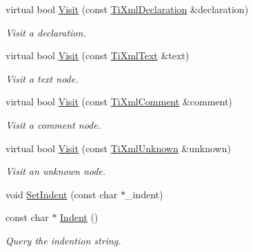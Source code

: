 \begin{DoxyCompactItemize}
virtual bool \hyperlink{classTiXmlPrinter_adaf7eec4dc43ad071ff52b60361574f5}{Visit} (const \hyperlink{classTiXmlDeclaration}{Ti\+Xml\+Declaration} \&declaration)
\begin{DoxyCompactList}\small\item\em Visit a declaration. \end{DoxyCompactList}\item 
\mbox{\label{classTiXmlPrinter_a0857c5d32c59b9a257f9a49cb9411df5}} 
virtual bool \hyperlink{classTiXmlPrinter_a0857c5d32c59b9a257f9a49cb9411df5}{Visit} (const \hyperlink{classTiXmlText}{Ti\+Xml\+Text} \&text)
\begin{DoxyCompactList}\small\item\em Visit a text node. \end{DoxyCompactList}\item 
\mbox{\label{classTiXmlPrinter_a9870423f5603630e6142f6bdb66dfb57}} 
virtual bool \hyperlink{classTiXmlPrinter_a9870423f5603630e6142f6bdb66dfb57}{Visit} (const \hyperlink{classTiXmlComment}{Ti\+Xml\+Comment} \&comment)
\begin{DoxyCompactList}\small\item\em Visit a comment node. \end{DoxyCompactList}\item 
\mbox{\label{classTiXmlPrinter_a08591a15c9a07afa83c24e08b03d6358}} 
virtual bool \hyperlink{classTiXmlPrinter_a08591a15c9a07afa83c24e08b03d6358}{Visit} (const \hyperlink{classTiXmlUnknown}{Ti\+Xml\+Unknown} \&unknown)
\begin{DoxyCompactList}\small\item\em Visit an unknown node. \end{DoxyCompactList}\item 
void \hyperlink{classTiXmlPrinter_a213377a4070c7e625bae59716b089e5e}{Set\+Indent} (const char $\ast$\+\_\+indent)
\item 
\mbox{\label{classTiXmlPrinter_abb33ec7d4bad6aaeb57f4304394b133d}} 
const char $\ast$ \hyperlink{classTiXmlPrinter_abb33ec7d4bad6aaeb57f4304394b133d}{Indent} ()
\begin{DoxyCompactList}\small\item\em Query the indention string. \end{DoxyCompactList}\item 

\end{DoxyCompactItemize}
